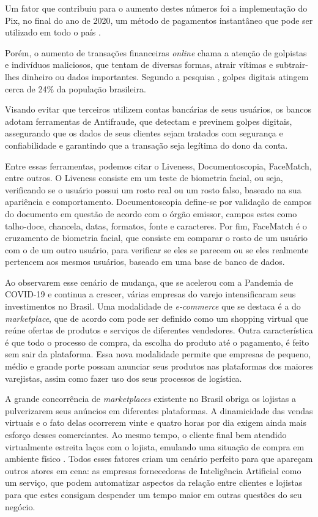 Um fator que contribuiu para o aumento destes números foi a implementação do Pix, no final do ano de 2020, um método de pagamentos instantâneo que pode ser utilizado em todo o país \cite{febraban2024}.

Porém, o aumento de transações financeiras \textit{online} chama a atenção de golpistas e indivíduos maliciosos, que tentam de diversas formas, atrair vítimas e subtrair-lhes dinheiro ou dados importantes. Segundo a pesquisa \cite{datasenado}, golpes digitais atingem cerca de 24\% da população brasileira.

Visando evitar que terceiros utilizem contas bancárias de seus usuários, os bancos adotam ferramentas de Antifraude, que detectam e previnem golpes digitais, assegurando que os dados de seus clientes sejam tratados com segurança e confiabilidade e garantindo que a transação seja legítima do dono da conta.

Entre essas ferramentas, podemos citar o Liveness, Documentoscopia, FaceMatch, entre outros. O Liveness consiste em um teste de biometria facial, ou seja, verificando se o usuário possui um rosto real ou um rosto falso, baseado na sua apariência e comportamento. Documentoscopia define-se por validação de campos do documento em questão de acordo com o órgão emissor, campos estes como talho-doce, chancela, datas, formatos, fonte e caracteres. Por fim, FaceMatch é o cruzamento de biometria facial, que consiste em comparar o rosto de um usuário com o de um outro usuário, para verificar se eles se parecem ou se eles realmente pertencem aos mesmos usuários, baseado em uma base de banco de dados.

Ao observarem esse cenário de mudança, que se acelerou com a Pandemia de COVID-19 e continua a crescer, várias empresas do varejo intensificaram seus investimentos no Brasil. Uma modalidade de \textit{e-commerce} que se destaca é a do \textit{marketplace}, que de acordo com \cite{marketplace} pode ser definido como um shopping virtual que reúne ofertas de produtos e serviços de diferentes vendedores. Outra característica é que todo o processo de compra, da escolha do produto até o pagamento, é feito sem sair da plataforma. Essa nova modalidade permite que empresas de pequeno, médio e grande porte possam anunciar seus produtos nas plataformas dos maiores varejistas, assim como fazer uso dos seus processos de logística.

A grande concorrência de \textit{marketplaces} existente no Brasil obriga os lojistas a pulverizarem seus anúncios em diferentes plataformas. A dinamicidade das vendas virtuais e o fato delas ocorrerem vinte e quatro horas por dia exigem ainda mais esforço desses comerciantes. Ao mesmo tempo, o cliente final bem atendido virtualmente estreita laços com o lojista, emulando uma situação de compra em ambiente físico \cite{singh}. Todos esses fatores criam um cenário perfeito para que apareçam outros atores em cena: as empresas fornecedoras de Inteligência Artificial como um serviço, que podem automatizar aspectos da relação entre clientes e lojistas para que estes consigam despender um tempo maior em outras questões do seu negócio.


